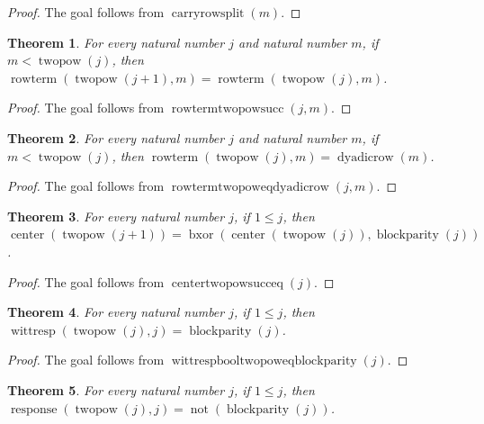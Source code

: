 \documentclass[11pt]{article}
\newtheorem{theorem}{Theorem}[section]
\theoremstyle{definition}
\begin{document}
\begin{proof}
The goal follows from \(\operatorname{carryrowsplit}(m)\).
\end{proof}
\begin{theorem}
\label{ll:observations:row-term-twopow-succ}
For every natural number \(j\) and natural number \(m\), if \(m < \operatorname{twopow}(j)\), then \(\operatorname{rowterm}(\operatorname{twopow}(j + 1), m) = \operatorname{rowterm}(\operatorname{twopow}(j), m)\).
\end{theorem}
\begin{proof}
The goal follows from \(\operatorname{rowtermtwopowsucc}(j, m)\).
\end{proof}
\begin{theorem}
\label{ll:observations:row-term-twopow-eq-dyadic-row}
For every natural number \(j\) and natural number \(m\), if \(m < \operatorname{twopow}(j)\), then \(\operatorname{rowterm}(\operatorname{twopow}(j), m) = \operatorname{dyadicrow}(m)\).
\end{theorem}
\begin{proof}
The goal follows from \(\operatorname{rowtermtwopoweqdyadicrow}(j, m)\).
\end{proof}
\begin{theorem}
\label{ll:observations:center-twopow-succ-eq}
For every natural number \(j\), if \(1 \le j\), then \(\operatorname{center}(\operatorname{twopow}(j + 1)) = \operatorname{bxor}(\operatorname{center}(\operatorname{twopow}(j)), \operatorname{blockparity}(j))\).
\end{theorem}
\begin{proof}
The goal follows from \(\operatorname{centertwopowsucceq}(j)\).
\end{proof}
\begin{theorem}
\label{ll:observations:witt-resp-bool-twopow-eq-block-parity}
For every natural number \(j\), if \(1 \le j\), then \(\operatorname{wittresp}(\operatorname{twopow}(j), j) = \operatorname{blockparity}(j)\).
\end{theorem}
\begin{proof}
The goal follows from \(\operatorname{wittrespbooltwopoweqblockparity}(j)\).
\end{proof}
\begin{theorem}
\label{ll:observations:response-twopow-eq-not-block-parity}
For every natural number \(j\), if \(1 \le j\), then \(\operatorname{response}(\operatorname{twopow}(j), j) = \operatorname{not}(\operatorname{blockparity}(j))\).
\end{theorem}
\end{document}
